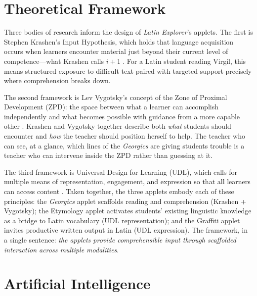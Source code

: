 \documentclass[11pt, a4paper]{article}
\begin{document}
\section{Theoretical Framework}

Three bodies of research inform the design of \textit{Latin Explorer}'s
applets. The first is Stephen Krashen's Input Hypothesis, which holds that
language acquisition occurs when learners encounter material just beyond
their current level of competence---what Krashen calls $i + 1$
\autocite{Krashen1982}. For a Latin student reading Virgil, this means
structured exposure to difficult text paired with targeted support precisely
where comprehension breaks down.

The second framework is Lev Vygotsky's concept of the Zone of Proximal
Development (ZPD): the space between what a learner can accomplish
independently and what becomes possible with guidance from a more capable
other \autocite{Vygotsky1978}. Krashen and Vygotsky together describe both
\textit{what} students should encounter and \textit{how} the teacher should
position herself to help. The teacher who can see, at a glance, which lines
of the \textit{Georgics} are giving students trouble is a teacher who can
intervene inside the ZPD rather than guessing at it.

The third framework is Universal Design for Learning (UDL), which calls for
multiple means of representation, engagement, and expression so that all
learners can access content \autocite{CAST2018}. Taken together, the three
applets embody each of these principles: the \textit{Georgics} applet
scaffolds reading and comprehension (Krashen + Vygotsky); the Etymology
applet activates students' existing linguistic knowledge as a bridge to
Latin vocabulary (UDL representation); and the Graffiti applet invites
productive written output in Latin (UDL expression). The framework, in a
single sentence: \textit{the applets provide comprehensible input through
scaffolded interaction across multiple modalities}.

\section{Artificial Intelligence}
\end{document}
